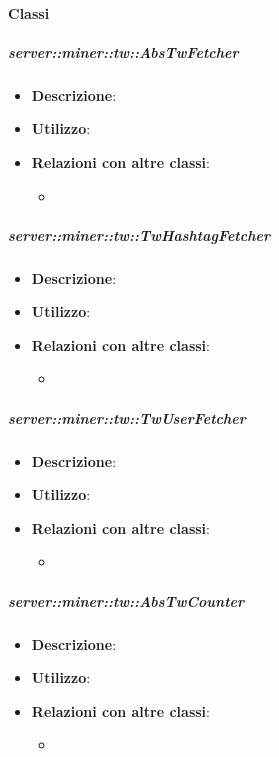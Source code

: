 	\paragraph{Classi} %
	\subparagraph{server::miner::tw::AbsTwFetcher} %
		\label{subp:server_miner_tw_AbsTwFetcher}
			\begin{itemize}
				\item \textbf{Descrizione}:
				\item \textbf{Utilizzo}: 
				\item \textbf{Relazioni con altre classi}:
					\begin{itemize}
						\item 
					\end{itemize}
			\end{itemize}
		
	\subparagraph{server::miner::tw::TwHashtagFetcher} %
		\label{subp:server_miner_tw_TwHashtagFetcher}
			\begin{itemize}
				\item \textbf{Descrizione}:
				\item \textbf{Utilizzo}: 
				\item \textbf{Relazioni con altre classi}:
					\begin{itemize}
						\item 
					\end{itemize}
			\end{itemize}
		
	\subparagraph{server::miner::tw::TwUserFetcher} %
		\label{subp:server_miner_tw_TwUserFetcher}
			\begin{itemize}
				\item \textbf{Descrizione}:
				\item \textbf{Utilizzo}: 
				\item \textbf{Relazioni con altre classi}:
					\begin{itemize}
						\item 
					\end{itemize}
			\end{itemize}
		
	\subparagraph{server::miner::tw::AbsTwCounter} %
		\label{subp:server_miner_tw_AbsTwCounter}
			\begin{itemize}
				\item \textbf{Descrizione}:
				\item \textbf{Utilizzo}: 
				\item \textbf{Relazioni con altre classi}:
					\begin{itemize}
						\item 
					\end{itemize}
			\end{itemize}
		

